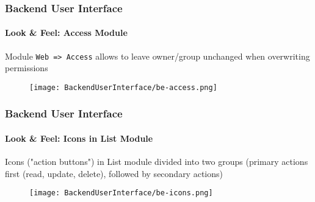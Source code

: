 
\begin{frame}[fragile]
	\frametitle{Backend User Interface}
	\framesubtitle{Look \& Feel: Access Module}

	Module \texttt{Web => Access} allows to leave owner/group unchanged\newline
	when overwriting permissions

	\begin{figure}
		\texttt{[image: BackendUserInterface/be-access.png]}
	\end{figure}

\end{frame}


\begin{frame}[fragile]
	\frametitle{Backend User Interface}
	\framesubtitle{Look \& Feel: Icons in List Module}

	Icons ("action buttons") in List module divided into two groups\newline
	\smaller (primary actions first (read, update, delete), followed by secondary actions)

	\begin{figure}
		\texttt{[image: BackendUserInterface/be-icons.png]}
	\end{figure}

\end{frame}

